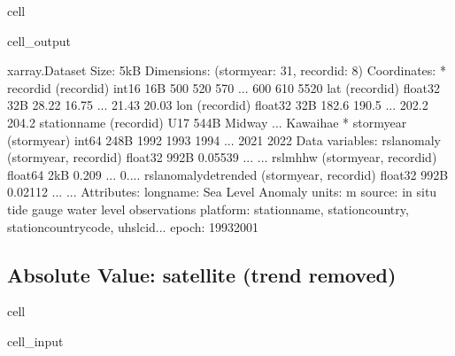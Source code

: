 \documentclass[letterpaper,10pt,english]{jupyterBook}
\begin{document}
\begin{sphinxuseclass}{cell}
\begin{sphinxVerbatimOutput}
\begin{sphinxuseclass}{cell_output}
\begin{sphinxVerbatim}[commandchars=\\\{\}]
\PYGZlt{}xarray.Dataset\PYGZgt{} Size: 5kB
Dimensions:                (storm\PYGZus{}year: 31, record\PYGZus{}id: 8)
Coordinates:
  * record\PYGZus{}id              (record\PYGZus{}id) int16 16B 500 520 570 ... 600 610 5520
    lat                    (record\PYGZus{}id) float32 32B 28.22 16.75 ... 21.43 20.03
    lon                    (record\PYGZus{}id) float32 32B 182.6 190.5 ... 202.2 204.2
    station\PYGZus{}name           (record\PYGZus{}id) \PYGZlt{}U17 544B \PYGZsq{}Midway\PYGZsq{} ... \PYGZsq{}Kawaihae\PYGZsq{}
  * storm\PYGZus{}year             (storm\PYGZus{}year) int64 248B 1992 1993 1994 ... 2021 2022
Data variables:
    rsl\PYGZus{}anomaly            (storm\PYGZus{}year, record\PYGZus{}id) float32 992B \PYGZhy{}0.05539 ... ...
    rsl\PYGZus{}mhhw               (storm\PYGZus{}year, record\PYGZus{}id) float64 2kB \PYGZhy{}0.209 ... \PYGZhy{}0....
    rsl\PYGZus{}anomaly\PYGZus{}detrended  (storm\PYGZus{}year, record\PYGZus{}id) float32 992B \PYGZhy{}0.02112 ... ...
Attributes:
    long\PYGZus{}name:  Sea Level Anomaly
    units:      m
    source:     in situ tide gauge water level observations
    platform:   station\PYGZus{}name, station\PYGZus{}country, station\PYGZus{}country\PYGZus{}code, uhslc\PYGZus{}id...
    epoch:      1993\PYGZhy{}2001
\end{sphinxVerbatim}

\end{sphinxuseclass}\end{sphinxVerbatimOutput}

\end{sphinxuseclass}

\subsection{Absolute Value: satellite (trend removed)}
\label{\detokenize{notebooks/regional_and_local/SL_anomaly_annual:absolute-value-satellite-trend-removed}}
\begin{sphinxuseclass}{cell}\begin{sphinxVerbatimInput}

\begin{sphinxuseclass}{cell_input}
\begin{sphinxVerbatim}[commandchars=\\\{\}]
    
\end{sphinxVerbatim}

\end{sphinxuseclass}\end{sphinxVerbatimInput}

\end{sphinxuseclass}
\end{document}
